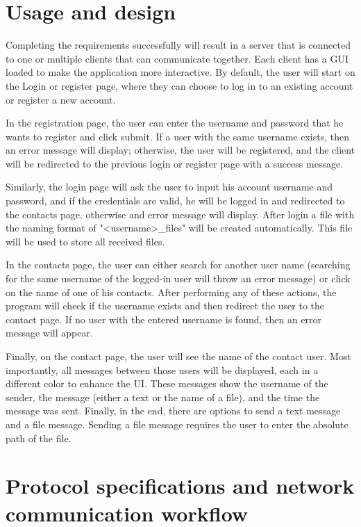 \documentclass{article}
\begin{document}
\section{Usage and design}

Completing the requirements successfully will result in a server that is connected to one or multiple clients that can communicate together. Each client has a GUI loaded to make the application more interactive. By default, the user will start on the Login or register page, where they can choose to log in to an existing account or register a new account.

In the registration page, the user can enter the username and password that he wants to register and click submit.  If a user with the same username exists, then an error message will display; otherwise, the user will be registered, and the client will be redirected to the previous login or register page with a success message.

Similarly, the login page will ask the user to input his account username and password, and if the credentials are valid, he will be logged in and redirected to the contacts page. otherwise and error message will display. After login a file with the naming format of "<username>\_files" will be created automatically. This file will be used to store all received files.

In the contacts page, the user can either search for another user name (searching for the same username of the logged-in user will throw an error message) or click on the name of one of his contacts. After performing any of these actions, the program will check if the username exists and then redirect the user to the contact page. If no user with the entered username is found, then an error message will appear.

Finally, on the contact page, the user will see the name of the contact user. Most importantly, all messages between those users will be displayed, each in a different color to enhance the UI. These messages show the username of the sender, the message (either a text or the name of a file), and the time the message was sent. Finally, in the end, there are options to send a text message and a file message. Sending a file message requires the user to enter the absolute path of the file.

\section{Protocol specifications and network communication workflow}
\end{document}

